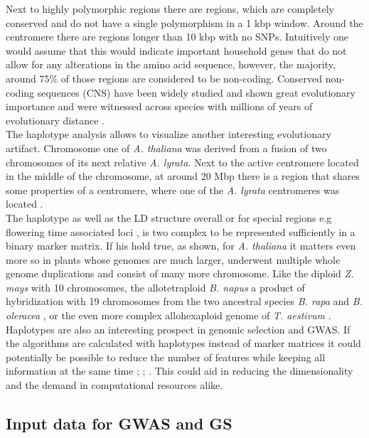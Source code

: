 Next to highly polymorphic regions there are regions, which are completely conserved and
do not have a single polymorphism in a 1 kbp window. Around the centromere there are
regions longer than 10 kbp with no SNPs. Intuitively one would assume that this would
indicate important household genes that do not allow for any alterations in the amino acid
sequence, however, the majority, around 75\% of those regions are considered to be
non-coding. Conserved non-coding sequences (CNS) have been widely studied and shown great
evolutionary importance and were witnessed across species with millions of years of
evolutionary distance \cite{Burgess946}. \\
The haplotype analysis allows to visualize another interesting evolutionary
artifact. Chromosome one of \textit{A. thaliana} was derived from a fusion of two
chromosomes of its next relative \textit{A. lyrata}. Next to the active centromere located
in the middle of the chromosome, at around 20 Mbp there is a region that shares some
properties of a centromere, where one of the \textit{A. lyrata} centromeres was
located \cite{koch2007evolution}. \\
The haplotype as well as the LD structure overall or for special regions e.g flowering
time associated loci \cite{li2014multiple}, is two complex to be represented sufficiently
in a binary marker matrix. If his hold true, as shown, for \textit{A. thaliana} it matters
even more so in plants whose genomes are much larger, underwent multiple whole genome
duplications and consist of many more chromosome. Like the diploid \textit{Z. mays} with
10 chromosomes, the allotetraploid \textit{B. napus} a product of hybridization with 19
chromosomes from the two ancestral species \textit{B. rapa} and \textit{B. oleracea}
\cite{liu2018brassica}, or the even more complex allohexaploid genome of
\textit{T. aestivum} \cite{international2018shifting}. \\
Haplotypes are also an interesting prospect in genomic selection and GWAS. If the
algorithms are calculated with haplotypes instead of marker matrices it could potentially
be possible to reduce the number of features while keeping all information at the same
time \cite{calus2008accuracy}; \cite{cuyabano2014genomic};
\cite{bekele2018haplotype}. This could aid in reducing the dimensionality and the demand
in computational resources alike.

\subsection{Input data for GWAS and GS}


